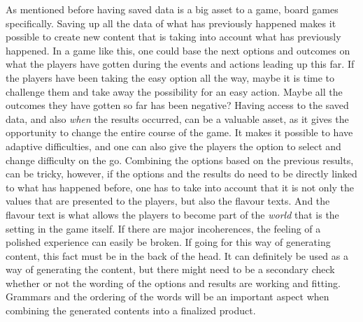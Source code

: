 As mentioned before having saved data is a big asset to a game, board games specifically. Saving up all the data of what has previously happened makes it possible to create new content that is taking into account what has previously happened. In a game like this, one could base the next options and outcomes on what the players have gotten during the events and actions leading up this far. If the players have been taking the easy option all the way, maybe it is time to challenge them and take away the possibility for an easy action. Maybe all the outcomes they have gotten so far has been negative? Having access to the saved data, and also \textit{when} the results occurred, can be a valuable asset, as it gives the opportunity to change the entire course of the game. It makes it possible to have adaptive difficulties, and one can also give the players the option to select and change difficulty on the go. Combining the options based on the previous results, can be tricky, however, if the options and the results do need to be directly linked to what has happened before, one has to take into account that it is not only the values that are presented to the players, but also the flavour texts. And the flavour text is what allows the players to become part of the \textit{world} that is the setting in the game itself. If there are major incoherences, the feeling of a polished experience can easily be broken. If going for this way of generating content, this fact must be in the back of the head. It can definitely be used as a way of generating the content, but there might need to be a secondary check whether or not the wording of the options and results are working and fitting. Grammars and the ordering of the words will be an important aspect when combining the generated contents into a finalized product.